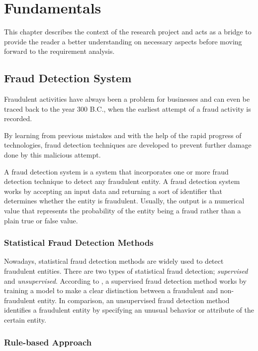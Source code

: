 \chapter{Fundamentals}

  This chapter describes the context of the research project and acts as a bridge to provide the reader a better understanding on necessary aspects before moving forward to the requirement analysis. 

  \section{Fraud Detection System}

    Fraudulent activities have always been a problem for businesses and can even be traced back to the year 300 B.C., when the earliest attempt of a fraud activity is recorded. 

    By learning from previous mistakes and with the help of the rapid progress of technologies, fraud detection techniques are developed to prevent further damage done by this malicious attempt. 
    
    A fraud detection system is a system that incorporates one or more fraud detection technique to detect any fraudulent entity. A fraud detection system works by accepting an input data and returning a sort of identifier that determines whether the entity is fraudulent. Usually, the output is a numerical value that represents the probability of the entity being a fraud rather than a plain true or false value. 

    \subsection{Statistical Fraud Detection Methods}
    
      Nowadays, statistical fraud detection methods are widely used to detect fraudulent entities. There are two types of statistical fraud detection; \emph{supervised} and \emph{unsupervised}. According to \autocite{statistical-fds}, a supervised fraud detection method works by training a model to make a clear distinction between a fraudulent and non-fraudulent entity. In comparison, an unsupervised fraud detection method identifies a fraudulent entity by specifying an unusual behavior or attribute of the certain entity.

    \subsection{Rule-based Approach}

